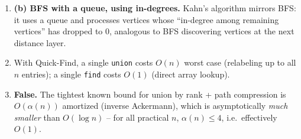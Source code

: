 \documentclass[11pt]{article}
\begin{document}
\begin{enumerate}[label=\textbf{B\arabic*.}, leftmargin=2.2em]
\item \textbf{(b) BFS with a queue, using in-degrees.} Kahn's algorithm mirrors BFS:
it uses a queue and processes vertices whose ``in-degree among remaining vertices'' has
dropped to 0, analogous to BFS discovering vertices at the next distance layer.

\item With Quick-Find, a single \texttt{union} costs $O(n)$ worst case (relabeling up to
all $n$ entries); a single \texttt{find} costs $O(1)$ (direct array lookup).

\item \textbf{False.} The tightest known bound for union by rank + path compression is
$O(\alpha(n))$ amortized (inverse Ackermann), which is asymptotically \emph{much smaller}
than $O(\log n)$ -- for all practical $n$, $\alpha(n) \le 4$, i.e.\ effectively $O(1)$.

\end{enumerate}
\end{document}
